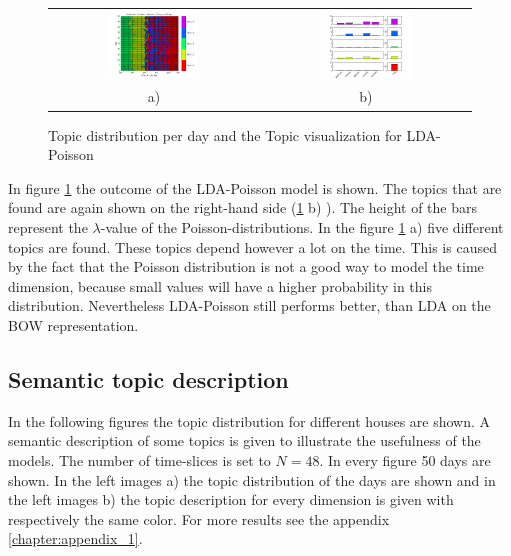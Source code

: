 \pagebreak
\begin{figure}
 \centering
 \begin{tabular}{c c}
  \centering
  \includegraphics[width=0.45\textwidth]{Pictures/TopDayHN3TS96k5Pois.png}
  &
  \includegraphics[width=0.45\textwidth]{Pictures/TopVisuHN3TS96k5Pois.png}\\
    a) & b)
 \end{tabular}
 \caption{Topic distribution per day and the Topic visualization for LDA-Poisson}
 \label{fig:Pois96}
\end{figure}  


In figure \ref{fig:Pois96} the outcome of the LDA-Poisson model is shown. The topics that are found are again shown on the right-hand side (\ref{fig:Pois96} b) ). The height of the bars represent the $\lambda$-value of the Poisson-distributions.
In the figure \ref{fig:Pois96} a) five different topics are found. These topics depend however a lot on the time. This is caused by the fact that the Poisson distribution is not a good way to model the time dimension, because small values will have a higher probability in this distribution. Nevertheless LDA-Poisson still performs better, than LDA on the BOW representation.



\subsection{Semantic topic description}
In the following figures the topic distribution for different houses are shown. A semantic description of some topics is given to illustrate the usefulness of the models. The number of time-slices is set to $N=48$. In every figure 50 days are shown. In the left images a) the topic distribution of the days are shown and in the left images b) the topic description for every dimension is given with respectively the same color. For more results see the appendix \ref{chapter:appendix_1}.\\

